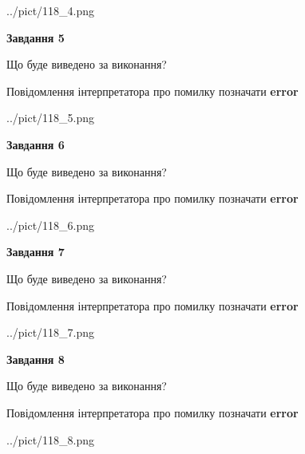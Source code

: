\documentclass[12pt, ukrainian]{article}
\begin{document}
{\begin{center}
	{../pict/118_4.png}
\end{center}
\newpage

{\begin {center}\textbf{Завдання 5}\end {center}}\par
Що буде виведено за виконання? \par
Повідомлення інтерпретатора про помилку позначати \textbf{error}

\begin{center}
	{../pict/118_5.png}
\end{center}
\newpage

{\begin {center}\textbf{Завдання 6}\end {center}}\par
Що буде виведено за виконання? \par
Повідомлення інтерпретатора про помилку позначати \textbf{error}

\begin{center}
	{../pict/118_6.png}
\end{center}
\newpage

{\begin {center}\textbf{Завдання 7}\end {center}}\par
Що буде виведено за виконання? \par
Повідомлення інтерпретатора про помилку позначати \textbf{error}

\begin{center}
	{../pict/118_7.png}
\end{center}
\newpage

{\begin {center}\textbf{Завдання 8}\end {center}}\par
Що буде виведено за виконання? \par
Повідомлення інтерпретатора про помилку позначати \textbf{error}

\begin{center}
	{../pict/118_8.png}
\end{center}
\newpage

}
\end{document}
